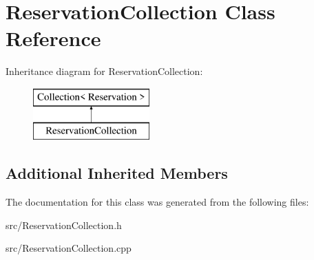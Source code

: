 \hypertarget{class_reservation_collection}{}\section{Reservation\+Collection Class Reference}
\label{class_reservation_collection}
Inheritance diagram for Reservation\+Collection\+:\begin{figure}[H]
\begin{center}
\leavevmode
\includegraphics[height=2.000000cm]{class_reservation_collection}
\end{center}
\end{figure}
\subsection*{Additional Inherited Members}


The documentation for this class was generated from the following files\+:\begin{DoxyCompactItemize}
\item 
src/Reservation\+Collection.\+h\item 
src/Reservation\+Collection.\+cpp\end{DoxyCompactItemize}
